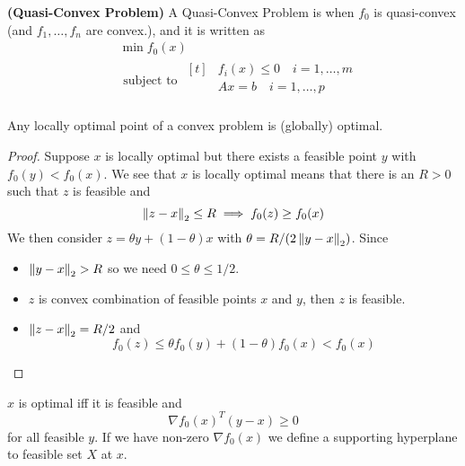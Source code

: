 \begin{definition}{\textbf{(Quasi-Convex Problem)}}
    A Quasi-Convex Problem is when $f_0$ is quasi-convex (and $f_1,\dots,f_n$ are convex.), and it is written as 
    \begin{equation*}
    \begin{aligned}
        &\min f_0(x) \\
        &\text{ subject to } \begin{aligned}[t]
            &f_i(x)\le0 \quad i=1,\dots,m \\
            &Ax=b \quad i=1,\dots,p \\
        \end{aligned}
    \end{aligned}
    \end{equation*}
\end{definition}

\begin{proposition}
    Any locally optimal point of a convex problem is (globally) optimal.
\end{proposition}
\begin{proof}
    Suppose $x$ is locally optimal but there exists a feasible point $y$ with $f_0(y) < f_0(x)$. We see that $x$ is locally optimal means that there is an $R>0$ such that $z$ is feasible and
    \begin{equation*}
        \left\lVert z-x\right\rVert_2\le R \implies f_0(z) \ge f_0(x)
    \end{equation*}
    We then consider $z = \theta y + (1-\theta) x$ with $\theta = R/(2\left\lVert y-x\right\rVert_2)$. Since 
    \begin{itemize}
        \item $\left\lVert y-x\right\rVert_2 > R$ so we need $0\le\theta\le1/2$.
        \item $z$ is convex combination of feasible points $x$ and $y$, then $z$ is feasible. 
        \item $\left\lVert z-x\right\rVert_2 = R/2$ and 
        \begin{equation*}
            f_0(z) \le \theta f_0(y) + (1-\theta)f_0(x) < f_0(x)
        \end{equation*}
    \end{itemize}
\end{proof}

\begin{proposition}
    $x$ is optimal iff it is feasible and
    \begin{equation*}
        \nabla f_0(x)^T(y-x) \ge 0
    \end{equation*}
    for all feasible $y$. If we have non-zero $\nabla f_0(x)$ we define a supporting hyperplane to feasible set $X$ at $x$.
\end{proposition}

